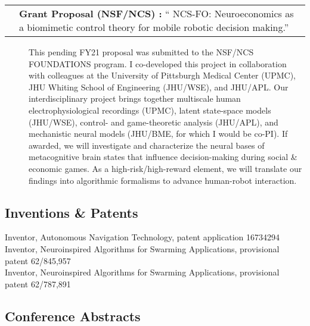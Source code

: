 \documentclass[10pt]{article}
\makeatletter
\newcommand{\unpubtitle}[1]{{\color{hopkinsblue} #1}}
\newcommand{\researchnote}[1]{
  \begin{description}
    \item[] {\hspace{2.2ex}\color{darkgray} #1}
  \end{description}
}
\newcommand{\researchactivity}[4]{
  \begin{minipage}[t]{\textwidth}
    \begin{tabular}{@{\hspace{2ex}}l>{\raggedright\arraybackslash}p{.8\textwidth}}
      \makebox[1.2in][l]{#1} & \textbf{#2:}
      ``\unpubtitle{#3}.'' 
    \end{tabular}
  \researchnote{\hspace{1ex} #4}
  \end{minipage}
  \medbreak
}
\newcommand{\lefttabline}[3]{\hspace{2ex}\makebox[#1][l]{#2} #3\\}
\makeatother
\begin{document}
\researchactivity
{Feb. 26, 2020}
{Grant Proposal (NSF/NCS) }
{NCS-FO: Neuroeconomics as a biomimetic control theory for mobile robotic
decision making}
{This pending FY21 proposal was submitted to the NSF/NCS FOUNDATIONS program. I
  co-developed this project in collaboration with colleagues at the University of
  Pittsburgh Medical Center (UPMC), JHU Whiting School of Engineering (JHU/WSE),
  and JHU/APL. Our interdisciplinary project brings together multiscale human
  electrophysiological recordings (UPMC), latent state-space models (JHU/WSE),
  control- and game-theoretic analysis (JHU/APL), and mechanistic neural models
  (JHU/BME, for which I would be co-PI). If awarded, we will investigate and
  characterize the neural bases of metacognitive brain states that influence
  decision-making during social \& economic games. As a high-risk/high-reward
  element, we will translate our findings into algorithmic formalisms to advance
human-robot interaction.}

\subsection*{Inventions \& Patents}

\lefttabline{0.8in}{1/3/2020}{Inventor, Autonomous Navigation Technology, patent
application 16734294}
\lefttabline{0.8in}{5/10/2019}{Inventor, Neuroinspired Algorithms for Swarming
Applications, provisional patent 62/845,957}
\lefttabline{0.8in}{1/3/2019}{Inventor, Neuroinspired Algorithms for Swarming
Applications, provisional patent 62/787,891}

\subsection*{Conference Abstracts}
\end{document}
